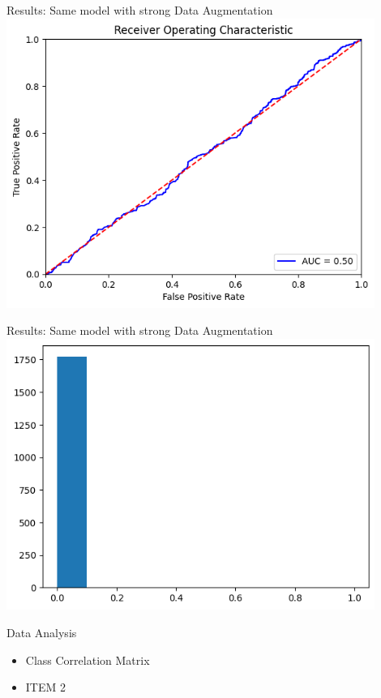 \begin{frame}{Results: Same model with strong Data Augmentation}
    \centering
    \includegraphics[height=0.9\textheight,width=0.9\textwidth,keepaspectratio]{images/ROC_Curve_DA.png}
\end{frame}

\begin{frame}{Results: Same model with strong Data Augmentation}
    \centering
    \includegraphics[height=0.9\textheight,width=0.9\textwidth,keepaspectratio]{images/distribution_DA.png}
\end{frame}



\begin{frame}{Data Analysis}
    \begin{itemize}
        \item Class Correlation Matrix
        \item ITEM 2
    \end{itemize}
\end{frame}

